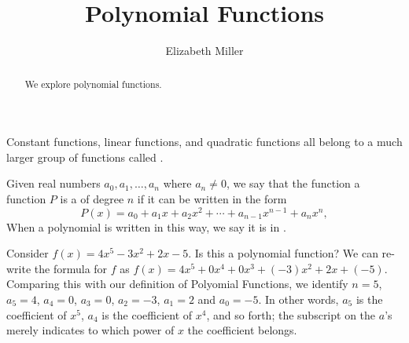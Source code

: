 \documentclass{ximera}
\author{Elizabeth Miller}
\title{Polynomial Functions}
\begin{document}
\begin{abstract}
We explore polynomial functions.
\end{abstract}
\maketitle
\licenseSZ


Constant functions, linear functions, and quadratic functions all belong to a much larger group of functions called .  

\begin{definition}
Given real numbers $a_0, a_1, \ldots, a_n$ where $a_n \neq 0$, we say that the function a function $P$ is a  of degree $n$ if
it can be written in the form%
$$
P(x) = a_0 + a_1 x + a_2 x^2 + \cdots + a_{n-1}x^{n-1} + a_n x^n, 
$$
When a polynomial is written in this way, we say it is in .
\end{definition}

Consider $f(x) = 4x^5 - 3x^2 + 2x - 5$.  Is this a polynomial function?  We can re-write the formula for $f$ as $f(x)= 4x^5 + 0 x^{4} + 0 x^{3} + (-3)x^2 + 2 x + (-5).$  Comparing this with our definition of Polyomial Functions, we identify $n=5$, $a_{5} = 4$, $a_{4} = 0$, $a_{3} = 0$, $a_{2} = -3$, $a_{1} = 2$ and $a_{0} = -5$.  In other words, $a_{5}$ is the coefficient of $x^{5}$, $a_{4}$ is the coefficient of $x^{4}$, and so forth;  the subscript on the $a$'s merely indicates to which power of $x$ the coefficient belongs.  
\end{document}
